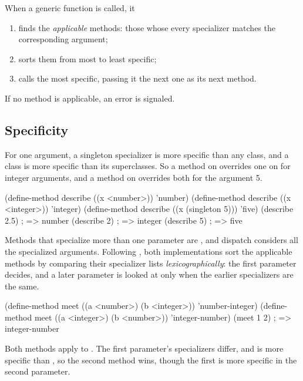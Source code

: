 When a generic function is called, it
\begin{enumerate}
\item finds the \emph{applicable} methods: those whose every specializer
  matches the corresponding argument;
\item sorts them from most to least specific;
\item calls the most specific, passing it the next one as its next method.
\end{enumerate}
\noindent If no method is applicable, an error is signaled.

\subsection{Specificity}\label{sec:functions-specificity}

For one argument, a singleton specializer is more specific than any class,
and a class is more specific than its superclasses. So a method on
 overrides one on  for integer arguments, and
a method on  overrides both for the argument 5.

\begin{dylan}
(define-method describe ((x <number>)) 'number)
(define-method describe ((x <integer>)) 'integer)
(define-method describe ((x (singleton 5))) 'five)
(describe 2.5)                 ; => number
(describe 2)                   ; => integer
(describe 5)                   ; => five
\end{dylan}

\noindent Methods that specialize more than one parameter are
, and dispatch considers all the specialized arguments.
Following , both implementations sort the applicable
methods by comparing their specializer lists \emph{lexicographically}: the
first parameter decides, and a later parameter is looked at only when the
earlier specializers are the same.

\begin{dylan}
(define-method meet ((a <number>) (b <integer>)) 'number-integer)
(define-method meet ((a <integer>) (b <number>)) 'integer-number)
(meet 1 2)                     ; => integer-number
\end{dylan}

\noindent Both methods apply to . The first parameter's
specializers differ, and  is more specific than
, so the second method wins, though the first is more
specific in the second parameter.

